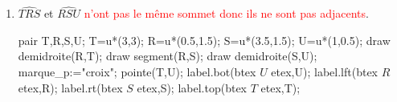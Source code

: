\begin{corrige}
\begin{enumerate}
\begin{Geometrie}[CoinHD={(4u,3.5u)}]
        \end{Geometrie}
        \item $\widehat{TRS}$ et $\widehat{RSU}$ \textcolor{red}{n'ont pas le même sommet donc ils ne sont pas adjacents}.\par
        \hspace*{-5mm}
        \begin{Geometrie}[CoinHD={(4u,3.5u)}]
            pair T,R,S,U;
            T=u*(3,3);
            R=u*(0.5,1.5);
            S=u*(3.5,1.5);
            U=u*(1,0.5);
            draw demidroite(R,T);
            draw segment(R,S);
            draw demidroite(S,U);
            marque_p:="croix";
            pointe(T,U);
            label.bot(btex $U$ etex,U);
            label.lft(btex $R$ etex,R);            
            label.rt(btex $S$ etex,S);
            label.top(btex $T$ etex,T);
        \end{Geometrie}
    \end{enumerate}
\end{corrige}